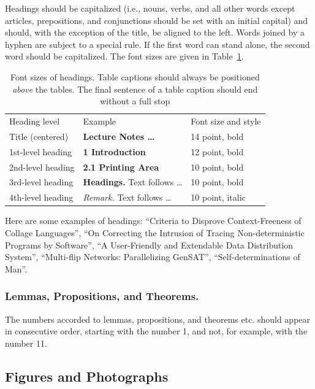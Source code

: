 \documentclass[runningheads]{llncs}
\begin{document}
Headings should be capitalized
(i.e., nouns, verbs, and all other words
except articles, prepositions, and conjunctions should be set with an
initial capital) and should,
with the exception of the title, be aligned to the left.
Words joined by a hyphen are subject to a special rule. If the first
word can stand alone, the second word should be capitalized.
The font sizes
are given in Table~\ref{table:headings}.
\setlength{\tabcolsep}{4pt}
\begin{table}
\begin{center}
\caption{Font sizes of headings. Table captions should always be
positioned {\it above} the tables. The final sentence of a table
caption should end without a full stop}
\label{table:headings}
\begin{tabular}{lll}
\hline\noalign{\smallskip}
Heading level & Example & Font size and style\\
\noalign{\smallskip}
\hline
\noalign{\smallskip}
Title (centered)  & {\Large \bf Lecture Notes \dots} & 14 point, bold\\
1st-level heading & {\large \bf 1 Introduction} & 12 point, bold\\
2nd-level heading & {\bf 2.1 Printing Area} & 10 point, bold\\
3rd-level heading & {\bf Headings.} Text follows \dots & 10 point, bold
\\
4th-level heading & {\it Remark.} Text follows \dots & 10 point,
italic\\
\hline
\end{tabular}
\end{center}
\end{table}
\setlength{\tabcolsep}{1.4pt}

Here are
some examples of headings: ``Criteria to Disprove Context-Freeness of
Collage Languages'', ``On Correcting the Intrusion of Tracing
Non-deterministic Programs by Software'', ``A User-Friendly and
Extendable Data Distribution System'', ``Multi-flip Networks:
Parallelizing GenSAT'', ``Self-determinations of Man''.

\subsubsection{Lemmas, Propositions, and Theorems.}

The numbers accorded to lemmas, propositions, and theorems etc. should
appear in consecutive order, starting with the number 1, and not, for
example, with the number 11.

\subsection{Figures and Photographs}
\label{sect:figures}
\end{document}
